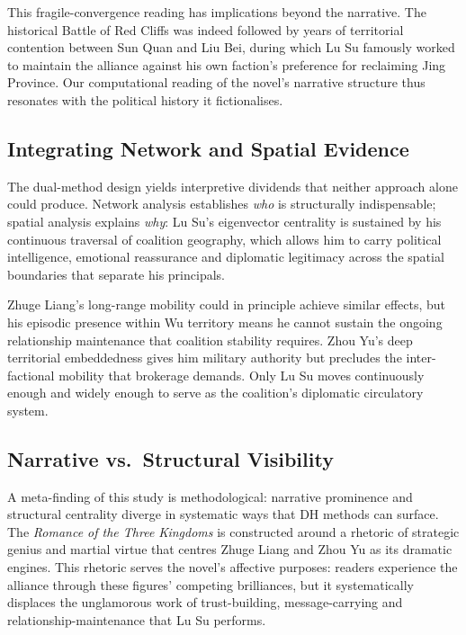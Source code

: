 \documentclass[12pt, a4paper]{article}
\newcommand{\booktitle}[1]{\textit{#1}}
\begin{document}
This fragile-convergence reading has implications beyond the narrative.
The historical Battle of Red Cliffs was indeed followed by years of
territorial contention between Sun Quan and Liu Bei, during which
Lu Su famously worked to maintain the alliance against his own faction's
preference for reclaiming Jing Province.
Our computational reading of the novel's narrative structure thus
resonates with the political history it fictionalises.

\subsection{Integrating Network and Spatial Evidence}

The dual-method design yields interpretive dividends that neither approach
alone could produce.
Network analysis establishes \emph{who} is structurally indispensable;
spatial analysis explains \emph{why}: Lu Su's eigenvector centrality is
sustained by his continuous traversal of coalition geography, which allows
him to carry political intelligence, emotional reassurance and diplomatic
legitimacy across the spatial boundaries that separate his principals.

Zhuge Liang's long-range mobility could in principle achieve similar
effects, but his episodic presence within Wu territory means he cannot
sustain the ongoing relationship maintenance that coalition stability
requires.
Zhou Yu's deep territorial embeddedness gives him military authority
but precludes the inter-factional mobility that brokerage demands.
Only Lu Su moves continuously enough and widely enough to serve as the
coalition's diplomatic circulatory system.

\subsection{Narrative vs.\ Structural Visibility}

A meta-finding of this study is methodological: narrative prominence and
structural centrality diverge in systematic ways that DH methods can
surface.
The \booktitle{Romance of the Three Kingdoms} is constructed around a
rhetoric of strategic genius and martial virtue that centres Zhuge Liang
and Zhou Yu as its dramatic engines.
This rhetoric serves the novel's affective purposes: readers experience
the alliance through these figures' competing brilliances, but it
systematically displaces the unglamorous work of trust-building,
message-carrying and relationship-maintenance that Lu Su performs.
\end{document}
